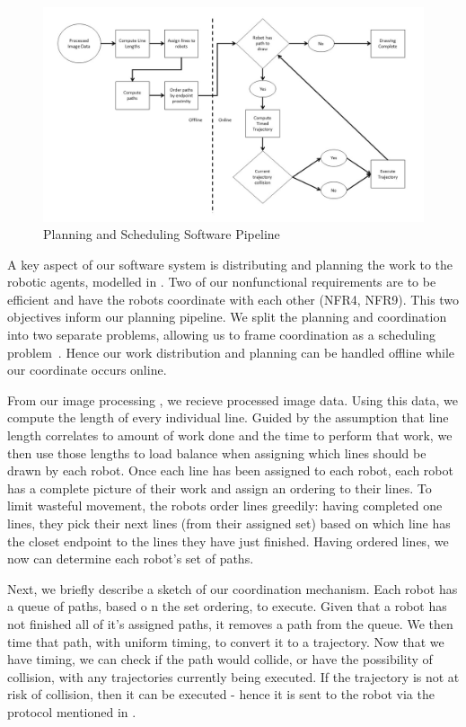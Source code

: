 \begin{figure}[h!]
 \centering
  \includegraphics[width=0.99\columnwidth]{diagrams/sw_arch_planning.jpg}
	\caption{Planning and Scheduling Software Pipeline}
 \label{fig:planning_processing}
\end{figure}

A key aspect of our software system is distributing and planning the work to the robotic agents, modelled in .
Two of our nonfunctional requirements are to be efficient and have the robots coordinate with each other (NFR4, NFR9). This two objectives inform our planning pipeline. We split the planning and coordination into two separate problems, allowing us to frame coordination as a scheduling problem~\cite{o1989deadlock}. Hence our work distribution and planning can be handled offline while our coordinate occurs online. 

From our image processing , we recieve processed image data. 
Using this data, we compute the length of every individual line. 
Guided by the assumption that line length correlates to amount of work done and the time to perform that work, we then use those lengths to load balance when assigning which lines should be drawn by each robot. 
Once each line has been assigned to each robot, each robot has a complete picture of their work and assign an ordering to their lines. 
To limit wasteful movement, the robots order lines greedily: having completed one lines, they pick their next lines (from their assigned set) based on which line has the closet endpoint to the lines they have just finished. 
Having ordered lines, we now can determine each robot's set of paths. 

Next, we briefly describe a sketch of our coordination mechanism. Each robot has a queue of paths, based o
n the set ordering, to execute.
Given that a robot has not finished all of it's assigned paths, it removes a path from the queue.
We then time that path, with uniform timing, to convert it to a trajectory. 
Now that we have timing, we can check if the path would collide, or have the possibility of collision, with any trajectories currently being executed. 
If the trajectory is not at risk of collision, then it can be executed - hence it is sent to the robot via the protocol mentioned in . 

